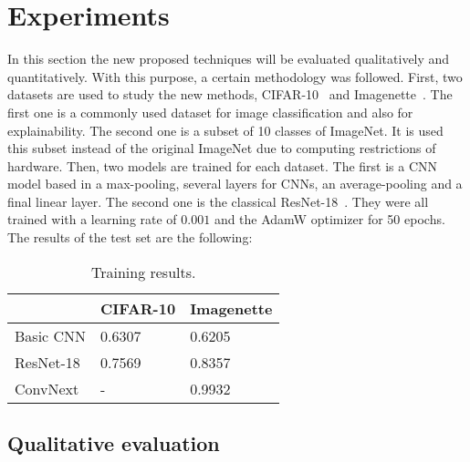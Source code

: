\documentclass[preprint,12pt]{elsarticle}
\begin{document}
\section{Experiments}
\label{sec:experiments}
In this section the new proposed techniques will be evaluated qualitatively and quantitatively. With this purpose, a certain methodology was followed. First, two datasets are used to study the new methods, {CIFAR-10}~\cite{CIFAR10CIFAR100Datasets} and Imagenette~\cite{Imagenette2022}. The first one is a commonly used dataset for image classification and also for explainability. The second one is a subset of 10 classes of ImageNet. It is used this subset instead of the original ImageNet due to computing restrictions of hardware. Then, two models are trained for each dataset. The first is a CNN model based in a max-pooling, several layers for CNNs, an average-pooling and a final linear layer. The second one is the classical ResNet-18~\cite{heDeepResidualLearning2016}. They were all trained with a learning rate of $0.001$ and the AdamW optimizer for 50 epochs. The results of the test set are the following:

\begin{table}[ht]
  \centering
  \small
  \caption{Training results.}
  \label{tab: training results}
  \begin{tabular}{L{2cm}C{2cm}C{2cm}}
    \toprule
    {} & CIFAR-10 & Imagenette \\
    \midrule
    Basic CNN & 0.6307 & 0.6205 \\
    ResNet-18  & 0.7569 & 0.8357 \\
    ConvNext & - & 0.9932 \\
    \bottomrule
  \end{tabular}
\end{table}

\subsection{Qualitative evaluation}
\end{document}
